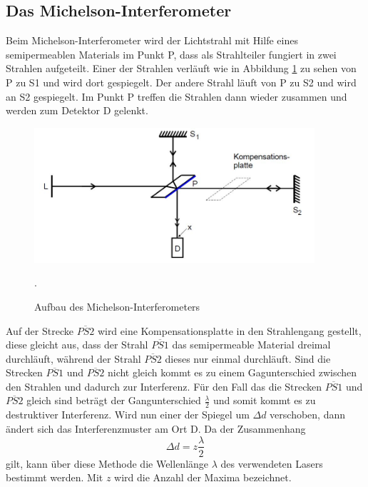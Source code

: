 \subsection{Das Michelson-Interferometer}
Beim Michelson-Interferometer wird der Lichtstrahl mit Hilfe eines semipermeablen Materials im Punkt P, dass
als Strahlteiler fungiert in zwei Strahlen aufgeteilt. Einer der Strahlen verläuft wie in
Abbildung \ref{fig:michel} zu sehen von P zu S1 und wird dort gespiegelt. Der andere Strahl läuft von
P zu S2 und wird an S2 gespiegelt. Im Punkt P treffen die Strahlen dann wieder zusammen und
werden zum Detektor D gelenkt.

\begin{figure}[H]
  \centering
  \includegraphics[height=5cm]{Michel.JPG}
  \caption{Aufbau des Michelson-Interferometers}
  \label{fig:michel}
  \cite{skript}.
\end{figure}

Auf der Strecke $\overline{PS2}$ wird eine Kompensationsplatte in den Strahlengang gestellt, diese
gleicht aus, dass der Strahl $\overline{PS1}$ das semipermeable Material dreimal durchläuft, während
der Strahl $\overline{PS2}$ dieses nur einmal durchläuft.
Sind die Strecken $\overline{PS1}$ und $\overline{PS2}$ nicht gleich kommt es zu einem Gagunterschied
zwischen den Strahlen und dadurch zur Interferenz.
Für den Fall das die Strecken $\overline{PS1}$ und $\overline{PS2}$ gleich sind beträgt der
Gangunterschied $\frac{\lambda}{2}$ und somit kommt es zu destruktiver Interferenz.
Wird  nun einer der Spiegel um $\Delta d$ verschoben, dann ändert sich das Interferenzmuster
am Ort D. Da der Zusammenhang
\begin{equation}
  \Delta d = z \frac{\lambda}{2}
  \label{interferenz}
\end{equation}
gilt, kann über diese Methode die Wellenlänge $\lambda$ des verwendeten Lasers bestimmt werden.
Mit $z$ wird die Anzahl der Maxima bezeichnet.\\

